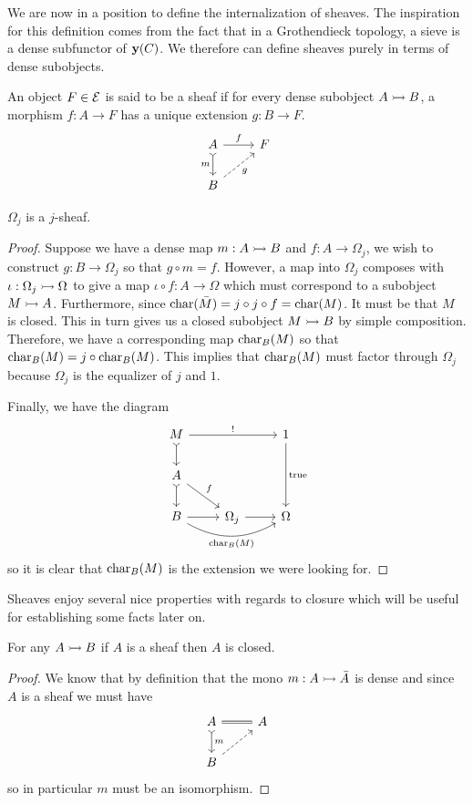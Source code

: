 We are now in a position to define the internalization of sheaves. The
inspiration for this definition comes from the fact that in a
Grothendieck topology, a sieve is a dense subfunctor of
$\mathbf{y}(C)$. We therefore can define sheaves purely in terms of dense
subobjects.

\begin{defn}\label{defn:background:sheaves}
  An object $F \in \mathcal{E}$ is said to be a sheaf if for every dense
  subobject $A \rightarrowtail B$, a morphism $f : A \to F$ has a unique
  extension $g : B \to F$.
  \[
    \begin{tikzcd}
      A \ar[d, rightarrowtail, swap, "m"] \ar[r, "f"] & F\\
      B \ar[ur, dashed, swap, "g"]
    \end{tikzcd}
  \]
\end{defn}
\begin{example}
  $\Omega_j$ is a $j$-sheaf.
\end{example}
\begin{proof}
  Suppose we have a dense map $m : A \rightarrowtail B$ and
  $f : A \to \Omega_j$, we wish to construct $g : B \to \Omega_j$ so
  that $g \circ m = f$. However, a map into $\Omega_j$ composes with
  $\iota : \Omega_j \rightarrowtail \Omega$ to give a map
  $\iota \circ f : A \to \Omega$ which must correspond to a subobject
  $M \rightarrowtail A$. Furthermore, since
  $\operatorname{char}(\bar{M}) = j \circ j \circ f = \operatorname{char}(M)$. It must be that $M$
  is closed. This in turn gives us a closed subobject $M \rightarrowtail B$ by
  simple composition. Therefore, we have a corresponding map
  $\operatorname{char}_B(M)$ so that $\operatorname{char}_B(M) = j \circ \operatorname{char}_B(M)$. This implies
  that $\operatorname{char}_B(M)$ must factor through $\Omega_j$ because $\Omega_j$
  is the equalizer of $j$ and $1$.

  Finally, we have the diagram
  \[
    \begin{tikzcd}
      M \ar[d, rightarrowtail] \ar[rr, "!"] & & 1 \ar[dd, "\true"]\\
      A \ar[d, rightarrowtail] \ar[dr, "f"] & & \\
      B \ar[r] \ar[rr, swap, bend right, "\charmap_B(M)"] & \Omega_j \ar[r] & \Omega
    \end{tikzcd}
  \]
  so it is clear that $\operatorname{char}_B(M)$ is the extension we were looking for.
\end{proof}
Sheaves enjoy several nice properties with regards to closure which
will be useful for establishing some facts later on.
\begin{lem}\label{lem:background:sheavesclosed}
  For any $A \rightarrowtail B$ if $A$ is a sheaf then $A$ is closed.
\end{lem}
\begin{proof}
  We know that by definition that the mono $m : A \rightarrowtail \bar{A}$ is
  dense and since $A$ is a sheaf we must have
  \[
    \begin{tikzcd}
      A \ar[d, rightarrowtail, "m"] \ar[r, equals] & A\\
      B \ar[ur, dashed]
    \end{tikzcd}
  \]
  so in particular $m$ must be an isomorphism.
\end{proof}

